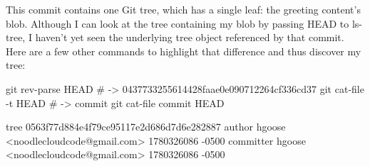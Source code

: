 \documentclass{report}
\begin{document}
\begin{itemize}
\begin{bashcode}
            \end{bashcode}
            \bigbreak \noindent 
            This commit contains one Git tree, which has a single leaf: the greeting content’s blob.
            \bigbreak \noindent 
            Although I can look at the tree containing my blob by passing HEAD to ls-tree, I haven’t yet seen the underlying tree object referenced by that commit. Here are a few other commands to highlight that difference and thus discover my tree:
            \bigbreak \noindent 
            \begin{bashcode}
                git rev-parse HEAD # -> 0437733255614428faae0e090712264cf336cd37
                git cat-file -t HEAD # -> commit
                git cat-file commit HEAD

                tree 0563f77d884e4f79ce95117e2d686d7d6e282887
                author hgoose <noodlecloudcode@gmail.com> 1780326086 -0500
                committer hgoose <noodlecloudcode@gmail.com> 1780326086 -0500


\end{bashcode}
\end{itemize}
\end{document}
